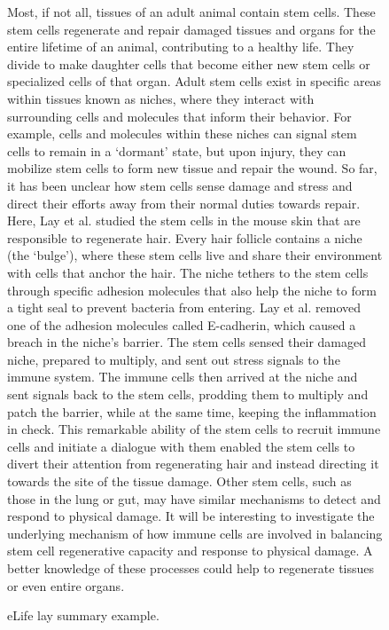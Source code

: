 \documentclass[11pt]{article}
\begin{document}
\begin{figure*}
\begin{minipage}{\textwidth}
{{            Most, if not all, tissues of an adult animal contain stem cells. These stem cells regenerate and repair damaged tissues and organs for the entire lifetime of an animal, contributing to a healthy life. They divide to make daughter cells that become either new stem cells or specialized cells of that organ. Adult stem cells exist in specific areas within tissues known as niches, where they interact with surrounding cells and molecules that inform their behavior. For example, cells and molecules within these niches can signal stem cells to remain in a `dormant' state, but upon injury, they can mobilize stem cells to form new tissue and repair the wound. So far, it has been unclear how stem cells sense damage and stress and direct their efforts away from their normal duties towards repair. Here, Lay et al. studied the stem cells in the mouse skin that are responsible to regenerate hair. Every hair follicle contains a niche (the `bulge'), where these stem cells live and share their environment with cells that anchor the hair. The niche tethers to the stem cells through specific adhesion molecules that also help the niche to form a tight seal to prevent bacteria from entering. Lay et al. removed one of the adhesion molecules called E-cadherin, which caused a breach in the niche's barrier. The stem cells sensed their damaged niche, prepared to multiply, and sent out stress signals to the immune system. The immune cells then arrived at the niche and sent signals back to the stem cells, prodding them to multiply and patch the barrier, while at the same time, keeping the inflammation in check. This remarkable ability of the stem cells to recruit immune cells and initiate a dialogue with them enabled the stem cells to divert their attention from regenerating hair and instead directing it towards the site of the tissue damage. Other stem cells, such as those in the lung or gut, may have similar mechanisms to detect and respond to physical damage. It will be interesting to investigate the underlying mechanism of how immune cells are involved in balancing stem cell regenerative capacity and response to physical damage. A better knowledge of these processes could help to regenerate tissues or even entire organs.
        }}
  \end{minipage} \quad
    \caption{eLife lay summary example.}
  \label{fig:laysum_example_elife}
\end{figure*}
 


 
\end{document}
